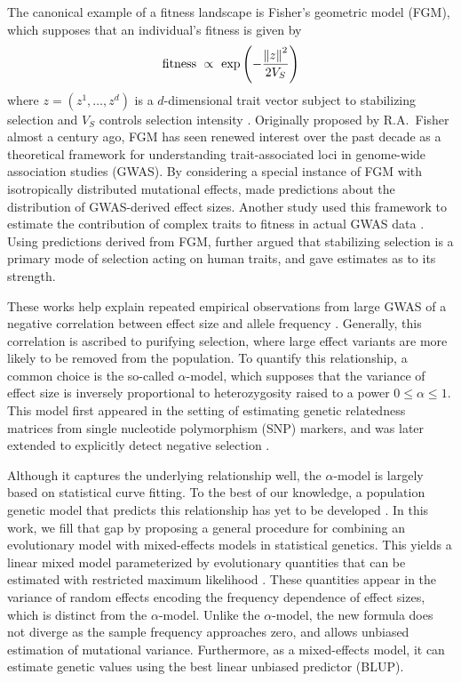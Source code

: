 \documentclass[10pt]{article}
\begin{document}
The canonical example of a fitness landscape is Fisher's geometric model (FGM), which supposes that an individual's fitness is given by
\begin{align} \label{eq:fitness}
    \text{fitness} \ \propto \
    \exp \left(
        -\frac{\left\| z \right\|^2}{2V_S} 
    \right)
\end{align}
where $z=(z^1, \ldots, z^d)$ is a $d$-dimensional trait vector subject to stabilizing selection and $V_S$ controls selection intensity \citep{fisher1999thegeneticaltheoryof,Tenaillon_2014}. 
Originally proposed by R.A.~Fisher almost a century ago, FGM has seen renewed interest over the past decade as a theoretical framework for understanding trait-associated loci in genome-wide association studies (GWAS).
By considering a special instance of FGM with isotropically distributed mutational effects, \citet{Simons2018popgeninterpretation} made predictions about the distribution of GWAS-derived effect sizes.
Another study used this framework to estimate the contribution of complex traits to fitness in actual GWAS data \citep{Simons2025scalinglaw}.
Using predictions derived from FGM, \citet{Koch2024} further argued that stabilizing selection is a primary mode of selection acting on human traits, and gave estimates as to its strength.

These works help explain repeated empirical observations
from large GWAS of a negative correlation between effect size and allele frequency \citep{Zeng_2018, Schoech_2019, Priv__2020}.
Generally, this correlation is ascribed to purifying selection, where large effect variants are more likely to be removed from the population.
To quantify this relationship, a common choice is the so-called $\alpha$-model, which supposes that the variance of effect size is inversely proportional to heterozygosity raised to a power $0\le \alpha \le 1$.
This model first appeared in the setting of estimating genetic relatedness matrices from single nucleotide polymorphism (SNP) markers, and was later extended to explicitly detect negative selection \citep{Zeng_2018, Schoech_2019}.

Although it captures the underlying relationship well, the $\alpha$-model is largely based on statistical curve fitting. To the best of our knowledge, a population genetic model that predicts this relationship has yet to be developed \citep{Sella_2019,Koch_2021}.
In this work, we fill that gap by proposing a general procedure for combining an evolutionary model with mixed-effects models in statistical genetics. 
This yields a linear mixed model parameterized by evolutionary quantities that can be estimated with restricted maximum likelihood \citep[REML;][]{Johnson_1995}.
These quantities appear in the variance of random effects encoding the frequency dependence of effect sizes, which is distinct from the $\alpha$-model.
Unlike the $\alpha$-model, the new formula does not diverge as the sample frequency approaches zero, and allows unbiased estimation of mutational variance.
Furthermore, as a mixed-effects model, it can estimate genetic values using the best linear unbiased predictor (BLUP).
\end{document}

